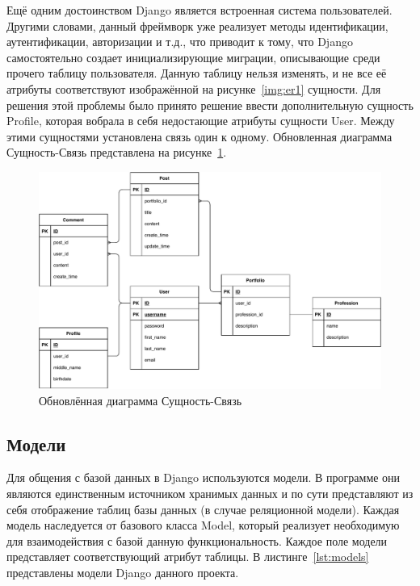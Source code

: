 Ещё одним достоинством Django является встроенная система пользователей. Другими словами, данный фреймворк уже реализует методы идентификации, аутентификации, авторизации и т.д., что приводит к тому, что Django самостоятельно создает инициализирующие миграции, описывающие среди прочего таблицу пользователя. Данную таблицу нельзя изменять, и не все её атрибуты соответствуют изображённой на рисунке~\ref{img:er1} сущности. Для решения этой проблемы было принято решение ввести дополнительную сущность Profile, которая вобрала в себя недостающие атрибуты сущности User. Между этими сущностями установлена связь один к одному. Обновленная диаграмма Сущность-Связь представлена на рисунке~\ref{img:er2}.

\begin{figure}[H]
    \centering
    \includegraphics[scale=0.65]{pdf/er2.pdf}
    \caption{Обновлённая диаграмма Сущность-Связь}\label{img:er2}
\end{figure}

\subsection{Модели}%
\label{sub:modeli}

Для общения с базой данных в Django используются модели. В программе они являются единственным источником хранимых данных и по сути представляют из себя отображение таблиц базы данных (в случае реляционной модели). Каждая модель наследуется от базового класса Model, который реализует необходимую для взаимодействия с базой данную функциональность. Каждое поле модели представляет соответствующий атрибут таблицы. В листинге~\ref{lst:models} представлены модели Django данного проекта.

